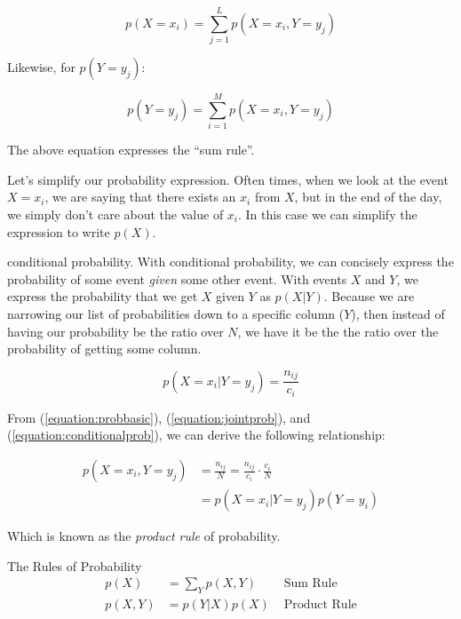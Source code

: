 \documentclass{tufte-handout}
\begin{document}
\begin{equation}
  p(X = x_i) = \sum\limits_{j = 1}^Lp(X = x_i, Y = y_j)
\end{equation}

Likewise, for $p(Y = y_j)$:

\begin{equation}
  p(Y = y_j) = \sum\limits_{i = 1}^Mp(X = x_i, Y = y_j)
\end{equation}


The above equation expresses the ``sum rule''.

Let's simplify our probability expression. Often times, when we look at the
event $X = x_i$, we are saying that there exists an $x_i$ from $X$, but in the
end of the day, we simply don't care about the value of $x_i$. In this case we
can simplify the expression to write $p(X)$.

 conditional probability. With conditional
probability, we can concisely express the probability of some event \emph{given}
some other event. With events $X$ and $Y$, we express the probability that we
get $X$ given $Y$ as $p(X|Y)$. Because we are narrowing our list of
probabilities down to a specific column ($Y$), then instead of having our
probability be the ratio over $N$, we have it be the the ratio over the
probability of getting some column.

\begin{equation} \label{equation:conditionalprob}
  p(X = x_i | Y = y_j) = \frac{n_{ij}}{c_i}
\end{equation}

From (\ref{equation:probbasic}), (\ref{equation:jointprob}), and
(\ref{equation:conditionalprob}), we can derive the following relationship:

\begin{equation}
  \begin{aligned}
    p(X = x_i , Y = y_j) &= \frac{n_{ij}}{N} = \frac{n_{ij}}{c_i} \cdot \frac{c_i}{N} \\
                         & = p(X = x_i | Y = y_j)p(Y = y_i)
  \end{aligned}
\end{equation}

Which is known as the \emph{product rule} of probability.

\begin{tcolorbox}
  The Rules of Probability
  \begin{align}
    p(X) &= \sum\limits_{Y}p(X, Y) & \text{    Sum Rule} \label{equation:sumrule}\\
    p(X, Y) &= p(Y|X)p(X) & \text{    Product Rule} \label{equation:productrule}
  \end{align}
\end{tcolorbox}
\end{document}
